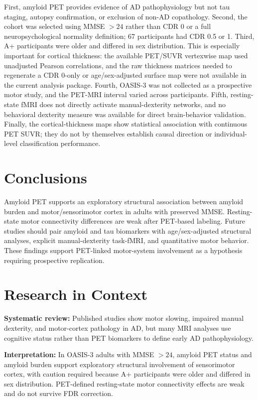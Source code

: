 \documentclass[review,3p,times,12pt,letterpaper]{elsarticle}
\begin{document}
First, amyloid PET provides evidence of AD pathophysiology but not tau staging, autopsy confirmation, or exclusion of non-AD copathology. Second, the cohort was selected using MMSE $>24$ rather than CDR 0 or a full neuropsychological normality definition; 67 participants had CDR 0.5 or 1. Third, A+ participants were older and differed in sex distribution. This is especially important for cortical thickness: the available PET/SUVR vertexwise map used unadjusted Pearson correlations, and the raw thickness matrices needed to regenerate a CDR 0-only or age/sex-adjusted surface map were not available in the current analysis package. Fourth, OASIS-3 was not collected as a prospective motor study, and the PET-MRI interval varied across participants. Fifth, resting-state fMRI does not directly activate manual-dexterity networks, and no behavioral dexterity measure was available for direct brain-behavior validation. Finally, the cortical-thickness maps show statistical association with continuous PET SUVR; they do not by themselves establish causal direction or individual-level classification performance.

\section{Conclusions}

Amyloid PET supports an exploratory structural association between amyloid burden and motor/sensorimotor cortex in adults with preserved MMSE. Resting-state motor connectivity differences are weak after PET-based labeling. Future studies should pair amyloid and tau biomarkers with age/sex-adjusted structural analyses, explicit manual-dexterity task-fMRI, and quantitative motor behavior. These findings support PET-linked motor-system involvement as a hypothesis requiring prospective replication.

\section*{Research in Context}

\textbf{Systematic review:} Published studies show motor slowing, impaired manual dexterity, and motor-cortex pathology in AD, but many MRI analyses use cognitive status rather than PET biomarkers to define early AD pathophysiology.

\textbf{Interpretation:} In OASIS-3 adults with MMSE $>24$, amyloid PET status and amyloid burden support exploratory structural involvement of sensorimotor cortex, with caution required because A+ participants were older and differed in sex distribution. PET-defined resting-state motor connectivity effects are weak and do not survive FDR correction.
\end{document}

